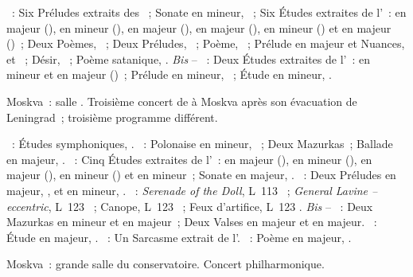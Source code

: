 \begin{description}
 \textsc{\Scriabine{}}~: Six Préludes extraits des ~;
 Sonate en \kF \Sharp mineur, ~; Six Études extraites de
 l'~: en \kC \Sharp majeur (), en \kF \Sharp mineur
 (), en \kE majeur (), en \kA \Flat majeur (),
 en \kG \Sharp mineur () et en \kB majeur ()~; Deux
 Poèmes, ~; Deux Préludes, ~; Poème, 
 ~; Prélude en \kE majeur et Nuances,   et
 ~; Désir,  ~; Poème satanique, .
 \emph{Bis} -- \textsc{\Scriabine{}}~: Deux Études extraites de l'~:
 en \kB \Flat mineur et en \kD \Flat majeur ()~; Prélude en \kE
 \Flat mineur,  ~; Étude en \kD \Sharp mineur, 
 .
 \item[\DateWithWeekDay{1942-05-10}]
 Moskva~: salle \Tchaikovski{}.
 Troisième concert de \VSofronitsky{} à Moskva après son évacuation de
 Leningrad~; troisième programme différent.

 \textsc{\Schumann{}}~: Études symphoniques, .
 \textsc{\Chopin{}}~: Polonaise en \kC \Sharp mineur,  ~;
 Deux Mazurkas~; Ballade en \kA \Flat majeur, .
 \textsc{\Scriabine{}}~: Cinq Études extraites de l'~: en \kC \Sharp
 majeur (), en \kF \Sharp mineur (), en \kB majeur
 (), en \kG \Sharp mineur () et en \kB \Flat mineur~;
 Sonate en \kF \Sharp majeur, .
 \textsc{\Rachmaninov{}}~: Deux Préludes en \kG majeur, 
 , et en \kG \Sharp mineur,  .
 \textsc{\Debussy{}}~: \emph{Serenade of the Doll}, L~113 ~;
 \emph{General Lavine -- eccentric}, L~123 ~; Canope, L~123
 ~; Feux d'artifice, L~123 .
 \emph{Bis} -- \textsc{\Chopin{}}~: Deux Mazurkas en \kC \Sharp mineur et en
 \kD \Flat majeur~; Deux Valses en \kG \Flat majeur et en \kD \Flat majeur.
 \textsc{\Scriabine{}}~: Étude en \kD \Flat majeur,  .
 \textsc{\Prokofiev{}}~: Un Sarcasme extrait de l'.
 \textsc{\Scriabine{}}~: Poème en \kD majeur,  .
 \item[\DateWithWeekDay{1942-05-23}]
 Moskva~: grande salle du conservatoire.
 Concert philharmonique.


\end{description}
